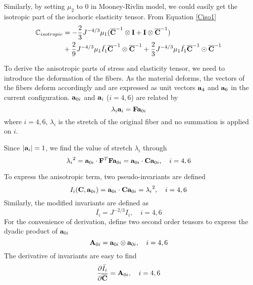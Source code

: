 Similarly, by setting $\mu_2$ to $0$ in Mooney-Rivlin model, we could easily get the isotropic part of the isochoric elasticity tensor. From Equation \ref{Ciso1}
\begin{equation} \label{Ciso32}
\begin{split}
\mathbb{C}_{isotropic} &=
- \frac{2}{3}J^{-4/3}\mu_1({\overline{\bold{C}}}^{-1} \otimes \bold{I} + \bold{I} \otimes {\overline{\bold{C}}}^{-1})  \\
&+
\frac{2}{9}J^{-4/3}\mu_1\bar{I_1}  {\overline{\bold{C}}}^{-1} \otimes {\overline{\bold{C}}}^{-1} + \frac{2}{3}J^{-4/3} \mu_1\bar{I_1} {\overline{\bold{C}}}^{-1} \odot {\overline{\bold{C}}}^{-1} 
\end{split}
\end{equation}

To derive the anisotropic parts of stress and elasticity tensor, we need to introduce the deformation of the fibers. As the material deforms, the vectors of the fibers deform accordingly and are expressed as unit vectors $\bold{a}_4$ and $\bold{a}_6$ in the current configuration. $\bold{a}_{0i}$ and $\bold{a}_{i}$ ($i = 4, 6$) are related by 
\begin{equation} \label{vector}
\lambda_i\bold{a}_i = \bold{F}\bold{a}_{0i}
\end{equation} 
where $i = 4, 6$, $\lambda_i$ is the stretch of the original fiber and no summation is applied on $i$.

Since $|\bold{a}_i| = 1$, we find the value of stretch $\lambda_i$ through
\begin{equation}
{\lambda_i}^2 = \bold{a}_{0i} \cdot \bold{F}^T\bold{F}\bold{a}_{0i} = \bold{a}_{0i} \cdot \bold{C}\bold{a}_{0i}, \quad i = 4, 6
\end{equation}

To express the anisotropic term, two pseudo-invariants are defined
\begin{equation} \label{pseudo-invariants}
I_i(\bold{C}, \bold{a}_{0i}) = \bold{a}_{0i} \cdot \bold{C}\bold{a}_{0i} = {\lambda_i}^2, \quad i = 4, 6
\end{equation}
Similarly, the modified invariants are defined as
\begin{equation}
\bar{I_i} = J^{-2/3}I_i, \quad i = 4, 6
\end{equation}
For the convenience of derivation, define two second order tensors to express the dyadic product of $\bold{a}_{0i}$
\begin{equation} \label{A0i}
\bold{A}_{0i} = \bold{a}_{0i} \otimes \bold{a}_{0i}, \quad i = 4, 6
\end{equation}
The derivative of invariants are easy to find
\begin{equation} \label{helper1}
\frac{\partial\bar I_i}{\partial \overline{\bold{C}}} = \bold{A}_{0i}, \quad i = 4, 6
\end{equation}


